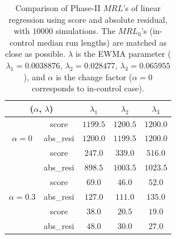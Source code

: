 \documentclass[twoside,11pt]{article}
\begin{document}
\begin{table}[!t]
\centering
\begin{tabular}{ccccc}
\toprule
\multicolumn{2}{c}{($ \alpha$, $ \lambda$)} & {$ \lambda_1$} & {$ \lambda_2$} & {$ \lambda_3$} \\
\midrule
\multirow{3}{*}{$ \alpha=0$} & score &$1199.5$ & $1200.5$ & $1200.0$ \\
& abs\_resi &$1200.0$ & $1199.5$ & $1200.0$ \\
\midrule
\multirow{3}{*}{$\alpha=0.1$} & score &$\bm{247.0}$ & $\bm{339.0}$ & $\bm{516.0}$ \\
& abs\_resi &$898.5$ & $1003.5$ & $1023.5$ \\
\midrule
\multirow{3}{*}{$\alpha=0.3$} & score &$\bm{69.0}$ & $\bm{46.0}$ & $\bm{52.0}$ \\
& abs\_resi &$127.0$ & $111.0$ & $135.0$ \\
\midrule
\multirow{3}{*}{$\alpha=0.5$} & score &$\bm{38.0}$ & $\bm{20.5}$ & $\bm{19.0}$ \\
& abs\_resi &$48.0$ & $30.0$ & $27.0$ \\
\midrule
\end{tabular}
\caption{Comparison of Phase-II $MRL$'s of linear regression using score and absolute residual, with $10000$ simulations. The $MRL_0$'s (in-control median run lengths) are matched as close as possible. $ \lambda$ is the EWMA parameter ( {$ \lambda_1 = 0.0038876$}, {$ \lambda_2 = 0.028477$}, {$ \lambda_3 =0.065955$}), and $ \alpha$ is the change factor ($ \alpha=0$ corresponds to in-control case).}
\label{tab:lin_MRL}
\end{table}
\end{document}
